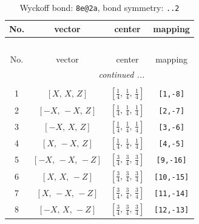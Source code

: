 \documentclass[fleqn,8pt]{jsarticle}
\begin{document}
\begin{longtable}{cccc}
\caption{Wyckoff bond: {\tt 8e@2a}, bond symmetry: {\tt ..2}}
 \\
 \hline \hline
No. & vector & center & mapping \\ \hline \endfirsthead

\multicolumn{3}{l}{\tablename\ \thetable{}} \\
 \hline \hline
No. & vector & center & mapping \\ \hline \endhead

 \hline \hline
\multicolumn{3}{r}{\footnotesize\it continued ...} \\ \endfoot

 \hline \hline
\multicolumn{3}{r}{} \\ \endlastfoot

1 & $\left[ X,\, X,\, Z \right]$ & $\left[ \frac{1}{4},\, \frac{1}{4},\, \frac{1}{4} \right]$ & {\tt [1,-8]} \\ \hline
2 & $\left[ - X,\, - X,\, Z \right]$ & $\left[ \frac{1}{4},\, \frac{1}{4},\, \frac{1}{4} \right]$ & {\tt [2,-7]} \\ \hline
3 & $\left[ - X,\, X,\, Z \right]$ & $\left[ \frac{1}{4},\, \frac{1}{4},\, \frac{1}{4} \right]$ & {\tt [3,-6]} \\ \hline
4 & $\left[ X,\, - X,\, Z \right]$ & $\left[ \frac{1}{4},\, \frac{1}{4},\, \frac{1}{4} \right]$ & {\tt [4,-5]} \\ \hline
5 & $\left[ - X,\, - X,\, - Z \right]$ & $\left[ \frac{3}{4},\, \frac{3}{4},\, \frac{3}{4} \right]$ & {\tt [9,-16]} \\ \hline
6 & $\left[ X,\, X,\, - Z \right]$ & $\left[ \frac{3}{4},\, \frac{3}{4},\, \frac{3}{4} \right]$ & {\tt [10,-15]} \\ \hline
7 & $\left[ X,\, - X,\, - Z \right]$ & $\left[ \frac{3}{4},\, \frac{3}{4},\, \frac{3}{4} \right]$ & {\tt [11,-14]} \\ \hline
8 & $\left[ - X,\, X,\, - Z \right]$ & $\left[ \frac{3}{4},\, \frac{3}{4},\, \frac{3}{4} \right]$ & {\tt [12,-13]} \\
\end{longtable}
\renewcommand{\arraystretch}{1.2}
\end{document}

